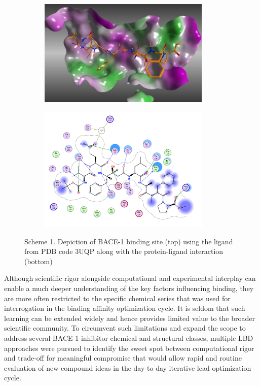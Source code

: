 \begin{figure}
  \centering
  \begin{subfigure}
  \centering
  \includegraphics[width=0.9\textwidth]{Images/bace_scheme1.jpg}
  \end{subfigure}
  \begin{subfigure}
  \centering
  \includegraphics[width=0.9\textwidth]{Images/bace_scheme1B.png}
  \end{subfigure}
  \caption{Scheme 1.  Depiction of BACE-1 binding site (top) using the ligand from PDB code 3UQP along with the protein-ligand interaction (bottom)}
  \label{fig:bace_scheme1}
\end{figure}


Although scientific rigor alongside computational and experimental interplay can enable a much deeper understanding of the key factors influencing binding, they are more often restricted to the specific chemical series that was used for interrogation in the binding affinity optimization cycle.  It is seldom that such learning can be extended widely and hence provides limited value to the broader scientific community.  To circumvent such limitations and expand the scope to address several BACE-1 inhibitor chemical and structural classes, multiple LBD approaches were pursued to identify the sweet spot between computational rigor and trade-off for meaningful compromise that would allow rapid and routine evaluation of new compound ideas in the day-to-day iterative lead optimization cycle.  

